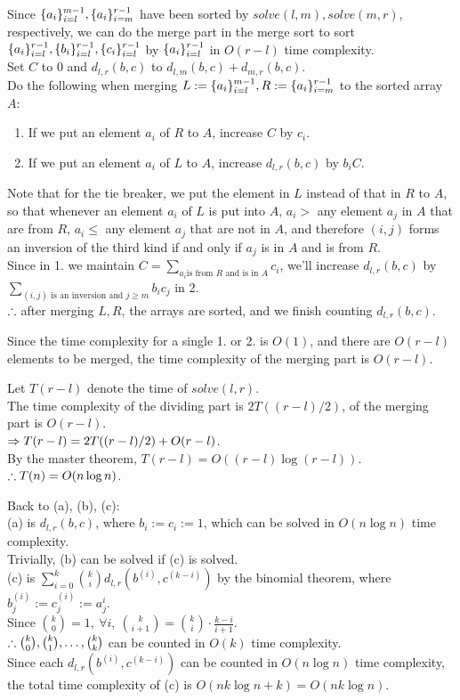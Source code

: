 \begin{pr}
Since $\{{a}_i\}_{i=l}^{m-1}, \{{a}_i\}_{i=m}^{r-1}$ have been sorted by $solve(l, m), solve(m, r)$, respectively, we can do the merge part in the merge sort to sort $\{{a}_i\}_{i=l}^{r-1}, \{{b}_i\}_{i=l}^{r-1}, \{{c}_i\}_{i=l}^{r-1}$ by $\{{a}_i\}_{i=l}^{r-1}$ in $O(r-l)$ time complexity.\\
Set $C$ to $0$ and $d_{l, r}(b, c)$ to $d_{l, m}(b, c)+d_{m, r}(b, c)$.\\
Do the following when merging $L:=\{{a}_i\}_{i=l}^{m-1}, R:=\{{a}_i\}_{i=m}^{r-1}$ to the sorted array $A$:
\begin{enumerate}
\item If we put an element $a_i$ of $R$ to $A$, increase $C$ by $c_i$.
\item If we put an element $a_i$ of $L$ to $A$, increase $d_{l, r}(b, c)$ by $b_iC$.
\end{enumerate}
Note that for the tie breaker, we put the element in $L$ instead of that in $R$ to $A$, so that whenever an element $a_i$ of $L$ is put into $A$, $a_i>$ any element $a_j$ in $A$ that are from $R$, $a_i\leq$ any element $a_j$ that are not in $A$, and therefore $(i, j)$ forms an inversion of the third kind if and only if $a_j$ is in $A$ and is from $R$.\\
Since in 1. we maintain $C=\sum_{a_i\text{is from }R\text{ and is in }A}c_i$, we'll increase $d_{l, r}(b, c)$ by $\sum_{(i, j)\text{ is an inversion and }j\geq m}b_ic_j$ in 2.\\
$\therefore$ after merging $L, R$, the arrays are sorted, and we finish counting $d_{l, r}(b, c)$.

Since the time complexity for a single 1. or 2. is $O(1)$, and there are $O(r-l)$ elements to be merged, the time complexity of the merging part is $O(r-l)$.

Let $T(r-l)$ denote the time of $solve(l, r)$.\\
The time complexity of the dividing part is $2T((r-l)/2)$, of the merging part is $O(r-l)$.\\
$\Rightarrow T(r-l)=2T((r-l)/2)+O(r-l)$.\\
By the master theorem, $T(r-l)=O((r-l)\log(r-l))$.\\
$\therefore T(n)=O(n\log n)$.

Back to (a), (b), (c):\\
(a) is $d_{l, r}(b, c)$, where $b_i:=c_i:=1$, which can be solved in $O(n\log n)$ time complexity.\\
Trivially, (b) can be solved if (c) is solved.\\
(c) is $\sum_{i=0}^k\binom kid_{l, r}(b^{(i)}, c^{(k-i)})$ by the binomial theorem, where $b_j^{(i)}:=c_j^{(i)}:=a_j^i$.\\
Since $\binom k0=1,\ \forall i,\ \binom k{i+1}=\binom ki\cdot\frac{k-i}{i+1}$.\\
$\therefore\binom k0, \binom k1, \dots, \binom kk$ can be counted in $O(k)$ time complexity.\\
Since each $d_{l, r}(b^{(i)}, c^{(k-i)})$ can be counted in $O(n\log n)$ time complexity, the total time complexity of (c) is $O(nk\log n+k)=O(nk\log n)$.
\end{pr}
